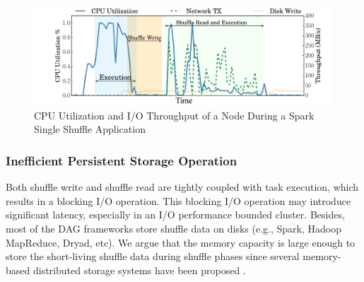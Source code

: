 {%
\begin{figure}
	\includegraphics[width=\linewidth]{fig/util}
	\caption{CPU Utilization and I/O Throughput of a Node During a Spark Single Shuffle Application}
	\label{fig:util}
	\vspace{-1em}
\end{figure}

\subsubsection{Inefficient Persistent Storage Operation}
Both shuffle write and shuffle read are tightly coupled with task execution, which results in a blocking I/O operation.
This blocking I/O operation may introduce significant latency, especially in an I/O performance bounded cluster.
Besides, most of the DAG frameworks store shuffle data on disks (e.g., Spark, Hadoop MapReduce, Dryad, etc).
We argue that the memory capacity is large enough to store the short-living shuffle data during shuffle phases since several memory-based distributed storage systems have been proposed \cite{tachyon, ramcloud}.


}
